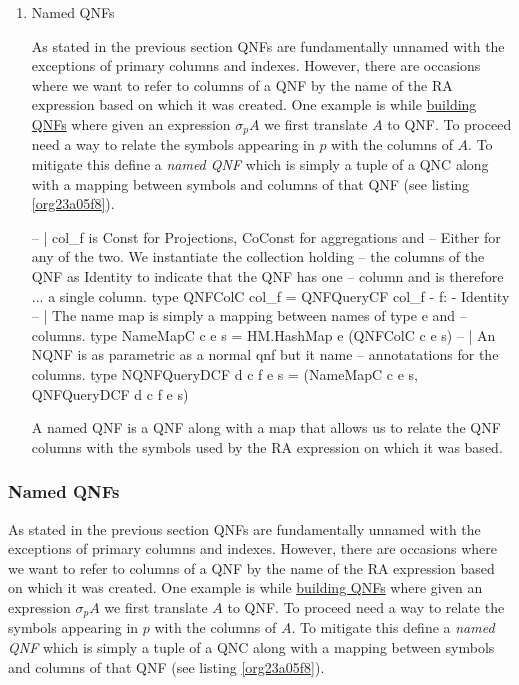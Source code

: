 \begin{enumerate}
\item Named QNFs
  \label{sec:orge07cacb}

  As stated in the previous section QNFs are fundamentally unnamed with
  the exceptions of primary columns and indexes. However, there are
  occasions where we want to refer to columns of a QNF by the name of
  the RA expression based on which it was created. One example is while
  \hyperref[sec:org3f1036f]{building QNFs} where given an expression \(\sigma_p A\) we first
  translate \(A\) to QNF. To proceed need a way to relate the symbols
  appearing in \(p\) with the columns of \(A\). To mitigate this define
  a \emph{named QNF} which is simply a tuple of a QNC along with a mapping
  between symbols and columns of that QNF (see listing \ref{org23a05f8}).

  \begin{code}
    \begin{haskellcode}
      -- | col_f is Const for Projections, CoConst for aggregations and
      -- Either for any of the two. We instantiate the collection holding
      -- the columns of the QNF as Identity to indicate that the QNF has one
      -- column and is therefore ... a single column.
      type QNFColC col_f = QNFQueryCF col_f {- f: -} Identity
      -- | The name map is simply a mapping between names of type e and
      -- columns.
      type NameMapC c e s = HM.HashMap e (QNFColC c e s)
      -- | An NQNF is as parametric as a normal qnf but it name
      -- annotatations for the columns.
      type NQNFQueryDCF d c f e s = (NameMapC c e s, QNFQueryDCF d c f e s)
    \end{haskellcode}
    \caption{\label{org23a05f8}A named QNF is a QNF along with a map that allows us to relate the QNF columns with the symbols used by the RA expression on which it was based.}
  \end{code}
\end{enumerate}


\subsubsection{Named QNFs}
\label{sec:org0612bfe}
As stated in the previous section QNFs are fundamentally unnamed with
the exceptions of primary columns and indexes. However, there are
occasions where we want to refer to columns of a QNF by the name of
the RA expression based on which it was created. One example is while
\hyperref[sec:org3f1036f]{building QNFs} where given an expression \(\sigma_p A\) we first
translate \(A\) to QNF. To proceed need a way to relate the symbols
appearing in \(p\) with the columns of \(A\). To mitigate this define
a \emph{named QNF} which is simply a tuple of a QNC along with a mapping
between symbols and columns of that QNF (see listing \ref{org23a05f8}).

